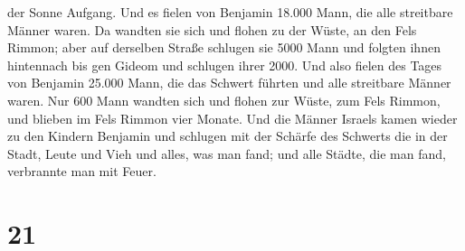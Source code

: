 der Sonne Aufgang.  Und es fielen von Benjamin 18.000
Mann, die alle streitbare Männer waren.  Da wandten sie
sich und flohen zu der Wüste, an den Fels Rimmon; aber auf derselben
Straße schlugen sie 5000 Mann und folgten ihnen hintennach bis gen
Gideom und schlugen ihrer 2000.  Und also fielen des
Tages von Benjamin 25.000 Mann, die das Schwert führten und alle
streitbare Männer waren.  Nur 600 Mann wandten sich und
flohen zur Wüste, zum Fels Rimmon, und blieben im Fels Rimmon vier
Monate.  Und die Männer Israels kamen wieder zu den
Kindern Benjamin und schlugen mit der Schärfe des Schwerts die in der
Stadt, Leute und Vieh und alles, was man fand; und alle Städte, die man
fand, verbrannte man mit Feuer.

\hypertarget{section-20}{%
\section{21}\label{section-20}}

